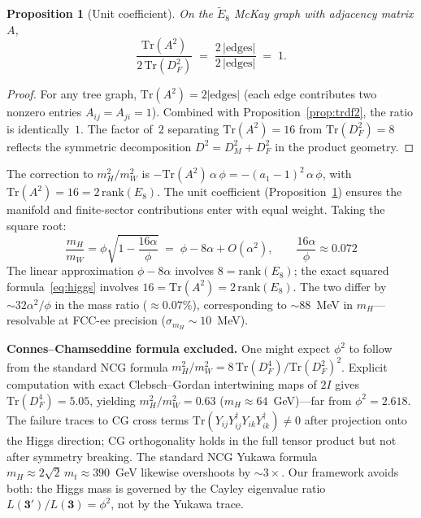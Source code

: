 \documentclass[12pt,a4paper]{article}
\newtheorem{proposition}{Proposition}
\theoremstyle{definition}
\begin{document}
\begin{proposition}[Unit coefficient]\label{prop:higgs_coeff}
On the $\widetilde{E}_8$ McKay graph with adjacency matrix $A$,
\[
\frac{\mathrm{Tr}(A^2)}{2\,\mathrm{Tr}(D_F^2)} \;=\; \frac{2\,|\mathrm{edges}|}{2\,|\mathrm{edges}|} \;=\; 1.
\]
\end{proposition}
\begin{proof}
For any tree graph, $\mathrm{Tr}(A^2) = 2|\mathrm{edges}|$ (each edge contributes two nonzero entries $A_{ij} = A_{ji} = 1$).  Combined with Proposition~\ref{prop:trdf2}, the ratio is identically~$1$.  The factor of~$2$ separating $\mathrm{Tr}(A^2) = 16$ from $\mathrm{Tr}(D_F^2) = 8$ reflects the symmetric decomposition $D^2 = D_M^2 + D_F^2$ in the product geometry.
\end{proof}

The correction to $m_H^2/m_W^2$ is $-\mathrm{Tr}(A^2)\,\alpha\,\phi = -(a_1-1)^2\,\alpha\,\phi$, with $\mathrm{Tr}(A^2) = 16 = 2\,\mathrm{rank}(E_8)$.  The unit coefficient (Proposition~\ref{prop:higgs_coeff}) ensures the manifold and finite-sector contributions enter with equal weight.  Taking the square root:
\begin{equation}
\frac{m_H}{m_W} = \phi\sqrt{1 - \frac{16\alpha}{\phi}} \;=\; \phi - 8\alpha + O(\alpha^2), \qquad \frac{16\alpha}{\phi} \approx 0.072
\label{eq:higgs_correction}
\end{equation}
The linear approximation $\phi - 8\alpha$ involves $8 = \mathrm{rank}(E_8)$; the exact squared formula~\eqref{eq:higgs} involves $16 = \mathrm{Tr}(A^2) = 2\,\mathrm{rank}(E_8)$.  The two differ by $\sim\!32\alpha^2/\phi$ in the mass ratio ($\approx 0.07\%$), corresponding to $\sim\!88$~MeV in $m_H$---resolvable at FCC-ee precision ($\sigma_{m_H} \sim 10$~MeV).

\textbf{Connes--Chamseddine formula excluded.}  One might expect $\phi^2$ to follow from the standard NCG formula $m_H^2/m_W^2 = 8\,\mathrm{Tr}(D_F^4)/\mathrm{Tr}(D_F^2)^2$.  Explicit computation with exact Clebsch--Gordan intertwining maps of $2I$ gives $\mathrm{Tr}(D_F^4) = 5.05$, yielding $m_H^2/m_W^2 = 0.63$ ($m_H \approx 64$~GeV)---far from $\phi^2 = 2.618$.  The failure traces to CG cross terms $\mathrm{Tr}(Y_{ij}Y_{ij}^\dagger Y_{ik}Y_{ik}^\dagger) \neq 0$ after projection onto the Higgs direction; CG orthogonality holds in the full tensor product but not after symmetry breaking.  The standard NCG Yukawa formula $m_H \approx 2\sqrt{2}\,m_t \approx 390$~GeV likewise overshoots by $\sim\!3\times$.  Our framework avoids both: the Higgs mass is governed by the Cayley eigenvalue ratio $L(\mathbf{3'})/L(\mathbf{3}) = \phi^2$, not by the Yukawa trace.
\end{document}
